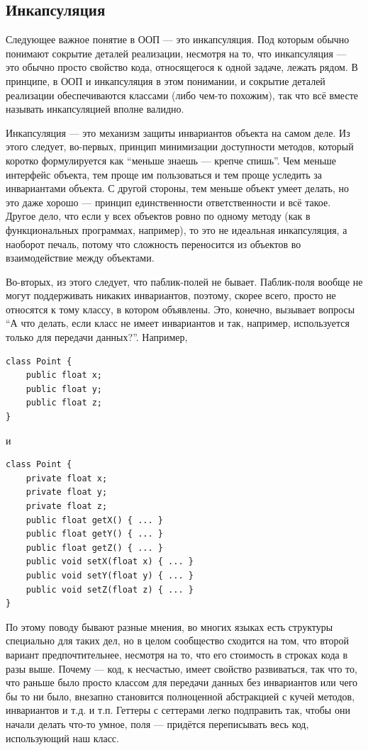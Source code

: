 \documentclass[a5paper]{article}
\begin{document}
\subsection{Инкапсуляция}

Следующее важное понятие в ООП --- это инкапсуляция. Под которым обычно понимают сокрытие деталей реализации, несмотря на то, что инкапсуляция --- это обычно просто свойство кода, относящегося к одной задаче, лежать рядом. В принципе, в ООП и инкапсуляция в этом понимании, и сокрытие деталей реализации обеспечиваются классами (либо чем-то похожим), так что всё вместе называть инкапсуляцией вполне валидно.

Инкапсуляция --- это механизм защиты инвариантов объекта на самом деле. Из этого следует, во-первых, принцип минимизации доступности методов, который коротко формулируется как ``меньше знаешь --- крепче спишь''. Чем меньше интерфейс объекта, тем проще им пользоваться и тем проще уследить за инвариантами объекта. С другой стороны, тем меньше объект умеет делать, но это даже хорошо --- принцип единственности ответственности и всё такое. Другое дело, что если у всех объектов ровно по одному методу (как в функциональных программах, например), то это не идеальная инкапсуляция, а наоборот печаль, потому что сложность переносится из объектов во взаимодействие между объектами.

Во-вторых, из этого следует, что паблик-полей не бывает. Паблик-поля вообще не могут поддерживать никаких инвариантов, поэтому, скорее всего, просто не относятся к тому классу, в котором объявлены. Это, конечно, вызывает вопросы ``А что делать, если класс не имеет инвариантов и так, например, используется только для передачи данных?''. Например,

\begin{verbatim}
class Point {
    public float x;
    public float y;
    public float z;
}
\end{verbatim}

и

\begin{verbatim}
class Point {
    private float x;
    private float y;
    private float z;
    public float getX() { ... }
    public float getY() { ... }
    public float getZ() { ... }
    public void setX(float x) { ... }
    public void setY(float y) { ... }
    public void setZ(float z) { ... }
}
\end{verbatim}

По этому поводу бывают разные мнения, во многих языках есть структуры специально для таких дел, но в целом сообщество сходится на том, что второй вариант предпочтительнее, несмотря на то, что его стоимость в строках кода в разы выше. Почему --- код, к несчастью, имеет свойство развиваться, так что то, что раньше было просто классом для передачи данных без инвариантов или чего бы то ни было, внезапно становится полноценной абстракцией с кучей методов, инвариантов и т.д. и т.п. Геттеры с сеттерами легко подправить так, чтобы они начали делать что-то умное, поля --- придётся переписывать весь код, использующий наш класс.
\end{document}
